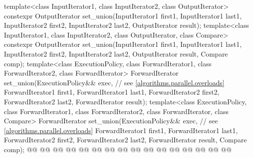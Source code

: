 \begin{codeblock}
{  template<class InputIterator1, class InputIterator2, class OutputIterator>
    constexpr OutputIterator
      set_union(InputIterator1 first1, InputIterator1 last1,
                InputIterator2 first2, InputIterator2 last2,
                OutputIterator result);
  template<class InputIterator1, class InputIterator2, class OutputIterator, class Compare>
    constexpr OutputIterator
                set_union(InputIterator1 first1, InputIterator1 last1,
                InputIterator2 first2, InputIterator2 last2,
                OutputIterator result, Compare comp);
  template<class ExecutionPolicy, class ForwardIterator1, class ForwardIterator2,
           class ForwardIterator>
    ForwardIterator
      set_union(ExecutionPolicy&& exec, // see \ref{algorithms.parallel.overloads}
                ForwardIterator1 first1, ForwardIterator1 last1,
                ForwardIterator2 first2, ForwardIterator2 last2,
                ForwardIterator result);
  template<class ExecutionPolicy, class ForwardIterator1, class ForwardIterator2,
           class ForwardIterator, class Compare>
    ForwardIterator
      set_union(ExecutionPolicy&& exec, // see \ref{algorithms.parallel.overloads}
                ForwardIterator1 first1, ForwardIterator1 last1,
                ForwardIterator2 first2, ForwardIterator2 last2,
                ForwardIterator result, Compare comp);
  @@
    @@
        @@
      @@
      @@
        @@
                  @@
    @@
        @@
      @@
      @@
                   @@
                   @@
        @@
                  @@
  @\added{\}}@

}
\end{codeblock}
